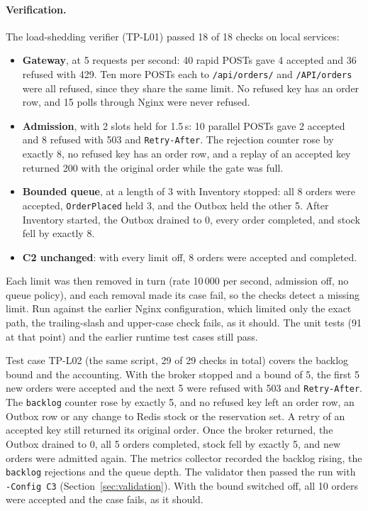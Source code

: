\documentclass[a4paper]{report}
\begin{document}
\paragraph{Verification.} The load-shedding verifier (TP-L01) passed
18 of 18 checks on local services:
\begin{itemize}
  \item \textbf{Gateway}, at 5 requests per second: 40 rapid POSTs gave 4
    accepted and 36 refused with 429. Ten more POSTs each to
    \texttt{/api/orders/} and \texttt{/API/orders} were all refused, since
    they share the same limit. No refused key has an order row, and 15 polls
    through Nginx were never refused.
  \item \textbf{Admission}, with 2 slots held for 1.5\,s: 10 parallel POSTs
    gave 2 accepted and 8 refused with 503 and \texttt{Retry-After}. The
    rejection counter rose by exactly 8, no refused key has an order row, and
    a replay of an accepted key returned 200 with the original order while the
    gate was full.
  \item \textbf{Bounded queue}, at a length of 3 with Inventory stopped: all 8
    orders were accepted, \texttt{OrderPlaced} held 3, and the Outbox held the
    other 5. After Inventory started, the Outbox drained to 0, every order
    completed, and stock fell by exactly 8.
  \item \textbf{C2 unchanged}: with every limit off, 8 orders were accepted and
    completed.
\end{itemize}
Each limit was then removed in turn (rate 10\,000 per second, admission off, no
queue policy), and each removal made its case fail, so the checks detect a
missing limit. Run against the earlier Nginx configuration, which limited only
the exact path, the trailing-slash and upper-case check fails, as it should.
The unit tests (91 at that point) and the earlier runtime test
cases still pass.

Test case TP-L02 (the same script, 29 of 29 checks in total) covers the
backlog bound and the accounting. With the broker stopped and a bound of 5,
the first 5 new orders were accepted and the next 5 were refused with 503 and
\texttt{Retry-After}. The \texttt{backlog} counter rose by exactly 5, and no
refused key left an order row, an Outbox row or any change to Redis stock or
the reservation set. A retry of an accepted key still returned its original
order. Once the broker returned, the Outbox drained to 0, all 5 orders
completed, stock fell by exactly 5, and new orders were admitted again. The
metrics collector recorded the backlog rising, the \texttt{backlog}
rejections and the queue depth. The validator then passed the run with
\texttt{-Config C3} (Section~\ref{sec:validation}). With the bound switched off,
all 10 orders were accepted and the case fails, as it should.
\end{document}
